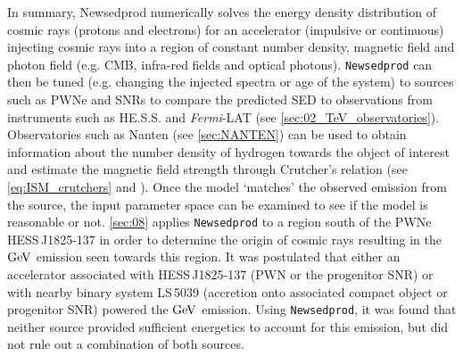 In summary, {\tt} Newsedprod numerically solves the energy density distribution of cosmic rays (protons and electrons) for an accelerator (impulsive or continuous) injecting cosmic rays into a region of constant number density, magnetic field and photon field (e.g. CMB, infra-red fields and optical photons). {\tt Newsedprod} can then be tuned (e.g. changing the injected spectra or age of the system) to sources such as PWNe and SNRs to compare the predicted SED to observations from instruments such as HE.S.S. and \textit{Fermi}-LAT (see \autoref{sec:02_TeV_observatories}). Observatories such as Nanten (see \autoref{sec:NANTEN}) can be used to obtain information about the number density of hydrogen towards the object of interest and estimate the magnetic field strength through Crutcher's relation (see \autoref{eq:ISM_crutchers} and \cite{2010ApJ...725..466C}). Once the model `matches' the observed emission from the source, the input parameter space can be examined to see if the model is reasonable or not.
\newpar
\autoref{sec:08} applies {\tt Newsedprod} to a region south of the PWNe \mbox{HESS\,J1825-137} in order to determine the origin of cosmic rays resulting in the $\si{\giga\electronvolt}$ emission seen towards this region. It was postulated that either an accelerator associated with \mbox{HESS\,J1825-137} (PWN or the progenitor SNR) or with nearby binary system \mbox{LS\,5039} (accretion onto associated compact object or progenitor SNR) powered the $\si{\giga\electronvolt}$ emission. Using {\tt Newsedprod}, it was found that neither source provided sufficient energetics to account for this emission, but did not rule out a combination of both sources.